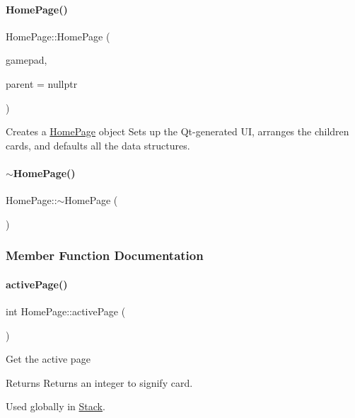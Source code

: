 \paragraph{\texorpdfstring{HomePage()}{HomePage()}}
{\footnotesize\ttfamily Home\+Page\+::\+Home\+Page (\begin{DoxyParamCaption}\item[{Q\+Gamepad $\ast$}]{gamepad,  }\item[{Q\+Widget $\ast$}]{parent = {\ttfamily nullptr} }\end{DoxyParamCaption})\hspace{0.3cm}{\ttfamily [explicit]}}

Creates a \mbox{\hyperlink{classHomePage}{Home\+Page}} object Sets up the Qt-\/generated UI, arranges the children cards, and defaults all the data structures. \mbox{\label{classHomePage_aff8e741021104752949c6935c7407f90}} 
\paragraph{\texorpdfstring{$\sim$HomePage()}{~HomePage()}}
{\footnotesize\ttfamily Home\+Page\+::$\sim$\+Home\+Page (\begin{DoxyParamCaption}{ }\end{DoxyParamCaption})}



\subsubsection{Member Function Documentation}
\mbox{\label{classHomePage_a0b6a91525a77e5ea66505666f7ba7c8d}} 
\paragraph{\texorpdfstring{activePage()}{activePage()}}
{\footnotesize\ttfamily int Home\+Page\+::active\+Page (\begin{DoxyParamCaption}{ }\end{DoxyParamCaption})}

Get the active page \begin{DoxyReturn}{Returns}
Returns an integer to signify card.
\end{DoxyReturn}
Used globally in \mbox{\hyperlink{classStack}{Stack}}. \mbox{\label{classHomePage_a63840fcd32af69c7d788ac93f6def734}} 
